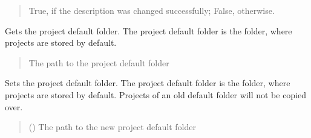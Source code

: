 \documentclass[letterpaper,10pt,english]{sphinxmanual}
\begin{document}
\begin{fulllineitems}
\begin{fulllineitems}
\begin{quote}
\begin{description}
\sphinxAtStartPar
True, if the description was changed successfully; False, otherwise.

\sphinxAtStartPar
{}

\end{description}\end{quote}

\end{fulllineitems}


\begin{fulllineitems}
\label{\detokenize{apidoc/src.osm_configurator.control:src.osm_configurator.control.control.Control.get_project_default_folder}}
\pysigstartsignatures
{}
\pysigstopsignatures
\sphinxAtStartPar
Gets the project default folder.
The project default folder is the folder, where projects are stored by default.
\begin{quote}\begin{description}
\sphinxAtStartPar
The path to the project default folder

\sphinxAtStartPar
{}

\end{description}\end{quote}

\end{fulllineitems}


\begin{fulllineitems}
\label{\detokenize{apidoc/src.osm_configurator.control:src.osm_configurator.control.control.Control.set_project_default_folder}}
\pysigstartsignatures
{}
\pysigstopsignatures
\sphinxAtStartPar
Sets the project default folder.
The project default folder is the folder, where projects are stored by default.
Projects of an old default folder will not be copied over.
\begin{quote}\begin{description}
\sphinxAtStartPar
{} () \textendash{} The path to the new project default folder


\end{description}
\end{quote}
\end{fulllineitems}
\end{fulllineitems}
\end{document}
